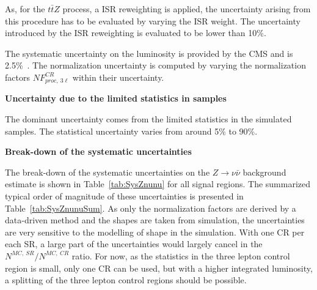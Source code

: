 As, for the $t\bar{t}Z$ process, a ISR reweighting is applied, the uncertainty arising from this procedure has to be evaluated by varying the ISR weight. The uncertainty introduced by the ISR reweighting is evaluated to be lower than 10\%. 

The systematic uncertainty on the luminosity is provided by the CMS and is  2.5\%~\cite{CMS-PAS-LUM-17-001}. The normalization uncertainty is computed by varying the normalization factors $NF_{proc,~3\ell}^{CR}$ within their uncertainty.

\newpage

\textbf{Uncertainty due to the limited statistics in samples}

The dominant uncertainty comes from the limited statistics in the simulated samples. The statistical uncertainty varies from around 5\% to 90\%.

\textbf{Break-down of the systematic uncertainties}

The break-down of the systematic uncertainties on the $Z \to \nu \bar{\nu}$  background estimate is shown in Table~\ref{tab:SysZnunu} for all signal regions. The summarized typical order of magnitude of these uncertainties is presented in Table~\ref{tab:SysZnunuSum}. As only the normalization factors are derived by a data-driven method and the shapes are taken from simulation, the uncertainties are very sensitive to the modelling of shape in the simulation. With one CR per each SR, a large part of the uncertainties would largely cancel in the $N^{MC,~SR}/ N^{MC,~CR}$ ratio. For now, as the statistics in the three lepton control region is small, only one CR can be used, but with a higher integrated luminosity, a splitting of the three lepton control regions should be possible.



